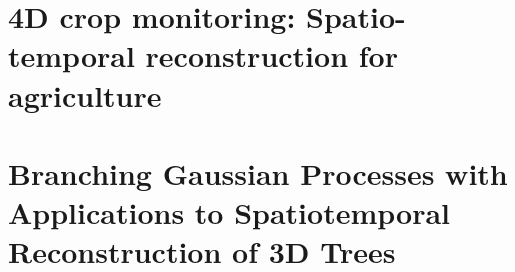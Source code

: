 \documentclass{article}
\begin{document}
\section{4D crop monitoring: Spatio-temporal reconstruction for agriculture ~\cite{dong-2017-4d}}

\section{Branching Gaussian Processes with Applications to Spatiotemporal Reconstruction of 3D Trees ~\cite{simek-2016-branching}}




	
\end{document}
